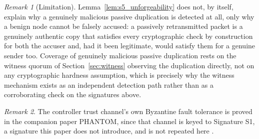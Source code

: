 \documentclass[final,5p,twocolumn]{elsarticle}
\theoremstyle{remark}
\newtheorem{remark}{Remark}
\theoremstyle{plain}
\begin{document}
\begin{remark}[Limitation]
	Lemma~\ref{lem:s5_unforgeability} does not, by itself, explain why a
	genuinely malicious passive duplication is detected at all, only why a
	benign node cannot be falsely accused: a passively retransmitted
	packet is a genuinely authentic copy that satisfies every
	cryptographic check by construction for both the accuser and, had it
	been legitimate, would satisfy them for a genuine sender too. Coverage
	of genuinely malicious passive duplication rests on the witness
	quorum of Section~\ref{sec:witness} observing the duplication
	directly, not on any cryptographic hardness assumption, which is
	precisely why the witness mechanism exists as an independent detection
	path rather than as a corroborating check on the signatures above.
\end{remark}

\begin{remark}
	The controller trust channel's own Byzantine fault tolerance is proved
	in the companion paper PHANTOM, since that channel is keyed to
	Signature S1, a signature this paper does not introduce, and is not
	repeated here \cite{Phantom2026}.
\end{remark}
\end{document}
